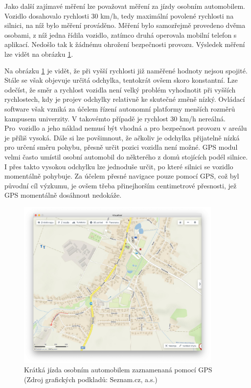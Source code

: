 \documentclass[czech, bachelor]{diploma}
\begin{document}
Jako další zajímavé měření lze považovat měření za jízdy osobním automobilem. Vozidlo dosahovalo rychlosti 30 km/h, tedy maximální
povolené rychlosti na silnici, na níž bylo měření prováděno. Měření bylo samozřejmě provedeno dvěma osobami, z níž jedna řídila
vozidlo, zatímco druhá operovala mobilní telefon s aplikací. Nedošlo tak k žádnému ohrožení bezpečnosti provozu. Výsledek měření
lze vidět na obrázku \ref{fig:olsinaautem}.

Na obrázku \ref{fig:olsinaautem} je vidět, že při vyšší rychlosti již naměřené hodnoty nejsou spojité. Stále se však objevuje
určitá odchylka, tentokrát ovšem skoro konstantní. Lze odečíst, že směr a rychlost vozidla není velký problém vyhodnotit při
vyšších rychlostech, kdy je projev odchylky relativně ke skutečné změně nízký. Ovládací software však vzniká za účelem řízení
autonomní platformy menších rozměrů kampusem univerzity. V takovémto případě je rychlost 30 km/h nereálná. Pro~vozidlo a jeho
náklad nemusí být vhodná a pro bezpečnost provozu v areálu je příliš vysoká. Dále si lze povšimnout, že ačkoliv je odchylka
přijatelně nízká pro určení směru pohybu, přesně určit pozici vozidla není možné. GPS modul velmi často umístil osobní automobil
do některého z domů stojících podél silnice. I přes takto vysokou odchylku lze jednoduše určit, po které silnici se vozidlo
momentálně pohybuje. Za účelem přesné navigace pouze pomocí GPS, což byl původní cíl výzkumu, je ovšem třeba přinejhorším
centimetrové přesnosti, jež GPS momentálně dosáhnout nedokáže.

\begin{figure}
    \centering
    \includegraphics[width=0.9\textwidth]{Figures/olsinaautem.png}
    \caption{Krátká jízda osobním automobilem zaznamenaná pomocí GPS (Zdroj grafických podkladů: Seznam.cz, a.s.)}
    \label{fig:olsinaautem}
\end{figure}
\end{document}
